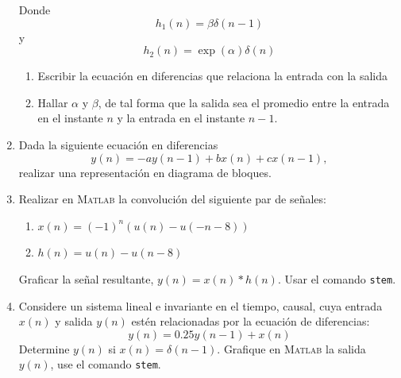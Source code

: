 \documentclass[a4paper,11pt,final]{article}
\begin{document}
\begin{enumerate}
        Donde
        $$h_1\left(n\right) = \beta\delta\left(n-1\right)$$
        y
        $$h_2\left(n\right) = \exp\left(\alpha\right)\delta\left(n\right)$$

        \begin{enumerate}
            \item Escribir la ecuación en diferencias que relaciona la entrada con la salida
            \item Hallar $\alpha$ y $\beta$, de tal forma que la salida sea el promedio entre la entrada en el instante $n$ y
            la entrada en el instante $n-1$.
        \end{enumerate}

        \item Dada la siguiente ecuación en diferencias
        $$y\left(n\right) = -a y\left(n-1\right) + b x\left(n\right) + c x\left(n-1\right),$$
        realizar una representación en diagrama de bloques.

        \item Realizar en \textsc{Matlab} la convolución del siguiente par de
        señales:

        \begin{enumerate}
            \item $x\left(n\right) = \left(-1\right)^n \left(u\left(n\right) - u\left(-n-8\right)\right)$
            \item $h\left(n\right) = u\left(n\right) - u\left(n-8\right)$
        \end{enumerate}

        Graficar la señal resultante, $y\left(n\right) = x\left(n\right) * h\left(n\right)$.
        Usar el comando \texttt{stem}.

        \item Considere un sistema lineal e invariante en el tiempo, causal,
        cuya entrada $x\left(n\right)$ y salida $y\left(n\right)$ estén
        relacionadas por la ecuación de diferencias:
        $$y\left(n\right) = 0.25 y\left(n-1\right) + x\left(n\right)$$
        Determine $y\left(n\right)$ si $x\left(n\right) = \delta\left(n-1\right)$.
        Grafique en \textsc{Matlab} la salida $y\left(n\right)$, use el comando \texttt{stem}.
    \end{enumerate}
\end{document}
